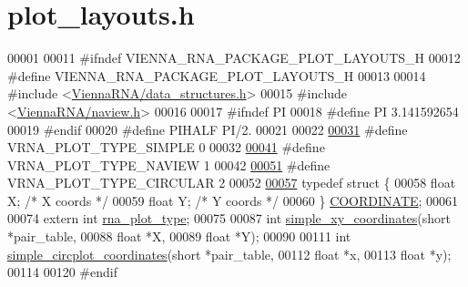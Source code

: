\hypertarget{plot__layouts_8h_source}{}\section{plot\+\_\+layouts.\+h}
\label{plot__layouts_8h_source}

\begin{DoxyCode}
00001 
00011 \textcolor{preprocessor}{#ifndef VIENNA\_RNA\_PACKAGE\_PLOT\_LAYOUTS\_H}
00012 \textcolor{preprocessor}{#define VIENNA\_RNA\_PACKAGE\_PLOT\_LAYOUTS\_H}
00013 
00014 \textcolor{preprocessor}{#include <\hyperlink{data__structures_8h}{ViennaRNA/data\_structures.h}>}
00015 \textcolor{preprocessor}{#include <\hyperlink{naview_8h}{ViennaRNA/naview.h}>}
00016 
00017 \textcolor{preprocessor}{#ifndef PI}
00018 \textcolor{preprocessor}{#define  PI       3.141592654}
00019 \textcolor{preprocessor}{#endif}
00020 \textcolor{preprocessor}{#define  PIHALF       PI/2.}
00021 
00022 
\hyperlink{group__plotting__utils_gae6d17b9f0a53cf5205a9181e0f8422e9}{00031} \textcolor{preprocessor}{#define VRNA\_PLOT\_TYPE\_SIMPLE     0}
00032 
\hyperlink{group__plotting__utils_ga94d4c863ecac2f220f76658afb92f964}{00041} \textcolor{preprocessor}{#define VRNA\_PLOT\_TYPE\_NAVIEW     1}
00042 
\hyperlink{group__plotting__utils_ga8c9eac631348da92136c8363ecdd9fb9}{00051} \textcolor{preprocessor}{#define VRNA\_PLOT\_TYPE\_CIRCULAR   2}
00052 
\hyperlink{group__plotting__utils}{00057} \textcolor{keyword}{typedef} \textcolor{keyword}{struct }\{
00058   \textcolor{keywordtype}{float} X; \textcolor{comment}{/* X coords */}
00059   \textcolor{keywordtype}{float} Y; \textcolor{comment}{/* Y coords */}
00060 \} \hyperlink{group__plotting__utils_structCOORDINATE}{COORDINATE};
00061 
00074 \textcolor{keyword}{extern} \textcolor{keywordtype}{int} \hyperlink{group__plotting__utils_ga5964c4581431b098b80027d6e14dcdd4}{rna\_plot\_type};
00075 
00087 \textcolor{keywordtype}{int} \hyperlink{group__plotting__utils_gaf4b9173e7d3fd361c3c85e6def194123}{simple\_xy\_coordinates}(\textcolor{keywordtype}{short} *pair\_table,
00088                           \textcolor{keywordtype}{float} *X,
00089                           \textcolor{keywordtype}{float} *Y);
00090 
00111 \textcolor{keywordtype}{int} \hyperlink{group__plotting__utils_gac4ea13d35308f09940178d2b05a248c2}{simple\_circplot\_coordinates}(\textcolor{keywordtype}{short} *pair\_table,
00112                                 \textcolor{keywordtype}{float} *x,
00113                                 \textcolor{keywordtype}{float} *y);
00114 
00120 \textcolor{preprocessor}{#endif}
\end{DoxyCode}
